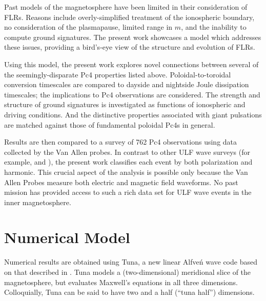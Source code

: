 \documentclass[draft,linenumbers]{agujournal}
\begin{document}
Past models of the magnetosphere have been limited in their consideration of FLRs. Reasons include overly-simplified treatment of the ionospheric boundary, no consideration of the plasmapause, limited range in $m$, and the inability to compute ground signatures. The present work showcases a model which addresses these issues, providing a bird's-eye view of the structure and evolution of FLRs.

Using this model, the present work explores novel connections between several of the seemingly-disparate Pc4 properties listed above. Poloidal-to-toroidal conversion timescales are compared to dayside and nightside Joule dissipation timescales; the implications to Pc4 observations are considered. The strength and structure of ground signatures is investigated as functions of ionospheric and driving conditions. And the distinctive properties associated with giant pulsations are matched against those of fundamental poloidal Pc4s in general.

Results are then compared to a survey of 762 Pc4 observations using data collected by the Van Allen probes. In contrast to other ULF wave surveys (for example, \citet{dai_2015} and \citet{motoba_2015}), the present work classifies each event by both polarization and harmonic. This crucial aspect of the analysis is possible only because the Van Allen Probes measure both electric and magnetic field waveforms. No past mission has provided access to such a rich data set for ULF wave events in the inner magnetosphere.



\section{Numerical Model}

Numerical results are obtained using Tuna, a new linear Alfve\'n wave code based on that described in \citet{lysak_2013}. Tuna models a (two-dimensional) meridional slice of the magnetosphere, but evaluates Maxwell's equations in all three dimensions. Colloquially, Tuna can be said to have two and a half (``tuna half'') dimensions.
\end{document}
